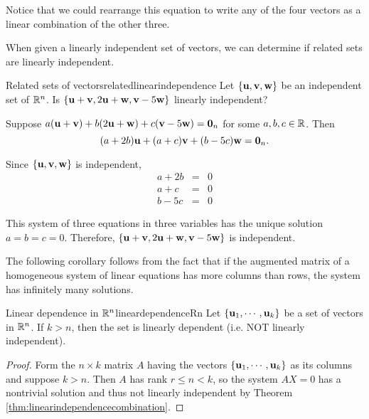 \begin{solution}
Notice that we could rearrange this equation to write any of the four vectors as a linear combination of the other three. 
\end{solution}

When given a linearly independent set of vectors, we can determine if related sets are linearly independent. 

\begin{example}{Related sets of vectors}{relatedlinearindependence}
Let $\{{\bf u},{\bf v},{\bf w}\}$ be an independent set of $\mathbb{R}^n$.
Is $\{{\bf u}+{\bf v}, 2{\bf u}+{\bf w}, {\bf v}-5{\bf w}\}$ linearly
independent?
\end{example}

\begin{solution}
Suppose $a({\bf u}+{\bf v}) + b(2{\bf u}+{\bf w}) + c({\bf v}-5{\bf w})={\bf 0}_n$
for some $a,b,c\in\mathbb{R}$.
Then 
\[ (a+2b){\bf u} + (a+c){\bf v} + (b-5c){\bf w}={\bf 0}_n.\]

Since $\{{\bf u},{\bf v},{\bf w}\}$ is independent, 
\begin{eqnarray*}
a + 2b & = & 0 \\
a + c & = & 0 \\
b - 5c & = & 0 
\end{eqnarray*}

This system of three equations in three variables has 
the unique solution $a=b=c=0$.
Therefore, $\{{\bf u}+{\bf v}, 2{\bf u}+{\bf w}, {\bf v}-5{\bf w}\}$ is independent.
\end{solution}

The following corollary follows from the fact that if the augmented matrix of a homogeneous
system of linear equations has more columns than rows, the system has infinitely many
solutions.

\begin{corollary}{Linear dependence in $\mathbb{R}^{n}$}{lineardependenceRn}
Let $\{{\bf u}_{1},\cdots ,{\bf u}_{k}\} $
be a set of vectors in $\mathbb{R}^{n}$. 
If $k>n$, then the set is linearly dependent (i.e. NOT linearly independent).
\end{corollary}

\begin{proof}
Form the $n \times k$ matrix $A$ having the vectors $\{
{\bf u}_{1},\cdots ,{\bf u}_{k}\} $ as its columns and suppose $k > n$. Then $A$ has rank $r \leq n <k$, so 
the system $AX=0$ has a nontrivial solution %
 and thus not linearly independent by Theorem 
 \ref{thm:linearindependencecombination}.
\end{proof}

